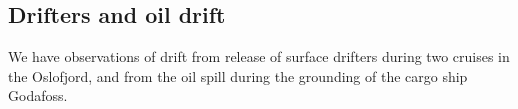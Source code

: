 

\newpage
\subsection{Drifters and oil drift}
We have observations of drift from release of surface drifters during two cruises in the Oslofjord, and from the oil spill during the grounding of the cargo ship Godafoss.

